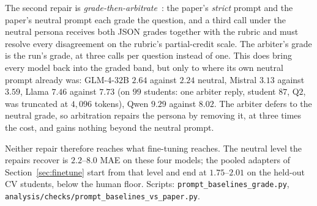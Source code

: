 The second repair is \emph{grade-then-arbitrate}~\citep{chan2023chatevalbetterllmbasedevaluators}: the paper's \emph{strict} prompt and the paper's neutral prompt each grade the question, and a third call under the neutral persona receives both JSON grades together with the rubric and must resolve every disagreement on the rubric's partial-credit scale. The arbiter's grade is the run's grade, at three calls per question instead of one. This does bring every model back into the graded band, but only to where its own neutral prompt already was: GLM-4-$32$B $2.64$ against $2.24$ neutral, Mistral $3.13$ against $3.59$, Llama $7.46$ against $7.73$ (on $99$ students: one arbiter reply, student $87$, Q$2$, was truncated at $4{,}096$ tokens), Qwen $9.29$ against $8.02$. The arbiter defers to the neutral grade, so arbitration repairs the persona by removing it, at three times the cost, and gains nothing beyond the neutral prompt.

Neither repair therefore reaches what fine-tuning reaches. The neutral level the repairs recover is $2.2$--$8.0$ MAE on these four models; the pooled adapters of Section~\ref{sec:finetune} start from that level and end at $1.75$--$2.01$ on the held-out CV students, below the human floor. Scripts: \texttt{prompt\_baselines\_grade.py}, \texttt{analysis/checks/prompt\_baselines\_vs\_paper.py}.


